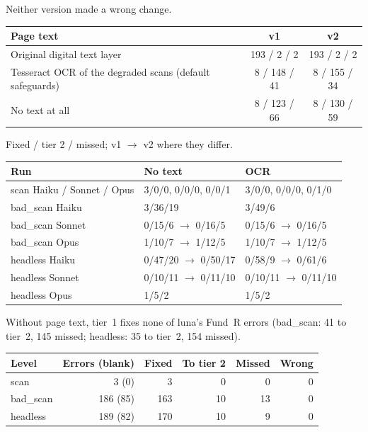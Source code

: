  Neither version made a wrong change.
\begin{center}
\begin{tabular}{lcc}
\toprule
Page text & v1 & v2 \\
\midrule
Original digital text layer & 193 / 2 / 2 & 193 / 2 / 2 \\
Tesseract OCR of the degraded scans (default safeguards) & 8 / 148 / 41 & 8 / 155 / 34 \\
No text at all & 8 / 123 / 66 & 8 / 130 / 59 \\
\bottomrule
\end{tabular}
\end{center}

 Fixed / tier 2 / missed; v1 $\rightarrow$ v2 where they differ.
\begin{center}
\begin{tabular}{lll}
\toprule
Run & No text & OCR \\
\midrule
scan Haiku / Sonnet / Opus & 3/0/0, 0/0/0, 0/0/1 & 3/0/0, 0/0/0, 0/1/0 \\
bad\_scan Haiku & 3/36/19 & 3/49/6 \\
bad\_scan Sonnet & 0/15/6 $\rightarrow$ 0/16/5 & 0/15/6 $\rightarrow$ 0/16/5 \\
bad\_scan Opus & 1/10/7 $\rightarrow$ 1/12/5 & 1/10/7 $\rightarrow$ 1/12/5 \\
headless Haiku & 0/47/20 $\rightarrow$ 0/50/17 & 0/58/9 $\rightarrow$ 0/61/6 \\
headless Sonnet & 0/10/11 $\rightarrow$ 0/11/10 & 0/10/11 $\rightarrow$ 0/11/10 \\
headless Opus & 1/5/2 & 1/5/2 \\
\bottomrule
\end{tabular}
\end{center}

 Without page text, tier~1 fixes none of luna's Fund~R errors (bad\_scan: 41 to tier~2, 145 missed; headless: 35 to tier~2, 154 missed).
\begin{center}
\begin{tabular}{lrrrrr}
\toprule
Level & Errors (blank) & Fixed & To tier 2 & Missed & Wrong \\
\midrule
scan & 3 (0) & 3 & 0 & 0 & 0 \\
bad\_scan & 186 (85) & 163 & 10 & 13 & 0 \\
headless & 189 (82) & 170 & 10 & 9 & 0 \\
\bottomrule
\end{tabular}
\end{center}

